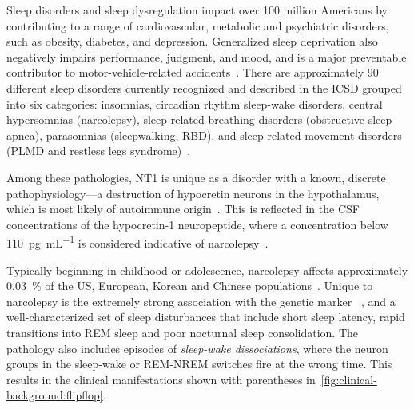Sleep disorders and sleep dysregulation impact over \num{100} million Americans by contributing to a range of cardiovascular, metabolic and psychiatric disorders, such as obesity, diabetes, and depression. 
Generalized sleep deprivation also negatively impairs performance, judgment, and mood, and is a major preventable contributor to motor-vehicle-related accidents~\cite{Findley1988}.
There are approximately 90 different sleep disorders currently recognized and described in the \ac{ICSD} grouped into six categories: insomnias, circadian rhythm sleep-wake disorders, central hypersomnias (\eg narcolepsy), sleep-related breathing disorders (\eg obstructive sleep apnea), parasomnias (\eg sleepwalking, \ac{RBD}), and sleep-related movement disorders (\eg \ac{PLMD} and restless legs syndrome)~\cite{AmericanAcademyofSleepMedicine2014}.%

Among these pathologies, \ac{NT1} is unique as a disorder with a known, discrete pathophysiology---a destruction of hypocretin neurons in the hypothalamus, which is most likely of autoimmune origin~\cite{Peyron2000, Mignot2002, Kornum2020}.
This is reflected in the \ac{CSF} concentrations of the hypocretin-1 neuropeptide, where a concentration below \SI{110}{\pico\gram\per\milli\liter} is considered indicative of narcolepsy~\cite{AmericanAcademyofSleepMedicine2014}. 

Typically beginning in childhood or adolescence, narcolepsy affects approximately \SI{0.03}{\percent} of the US, European, Korean and Chinese populations~\cite{Kornum2017}.
Unique to narcolepsy is the extremely strong association with the genetic marker \hla~\cite{Han2014}, and a well-characterized set of sleep disturbances that include short sleep latency, rapid transitions into \ac{REM} sleep and poor nocturnal sleep consolidation.
The pathology also includes episodes of \textit{sleep-wake dissociations}, where the neuron groups in the sleep-wake or \ac{REM}-\ac{NREM} switches fire at the wrong time.
This results in the clinical manifestations shown with parentheses in~\cref{fig:clinical-background:flipflop}.

